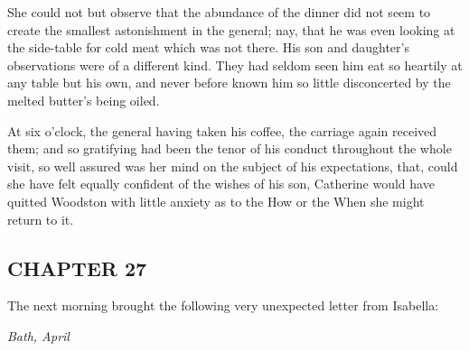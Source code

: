 She could not but observe that the abundance of the dinner did not seem to create the smallest astonishment in the general; nay, that he was even looking at the side-table for cold meat which was not there. His son and daughter's observations were of a different kind. They had seldom seen him eat so heartily at any table but his own, and never before known him so little disconcerted by the melted butter's being oiled.

At six o'clock, the general having taken his coffee, the carriage again received them; and so gratifying had been the tenor of his conduct throughout the whole visit, so well assured was her mind on the subject of his expectations, that, could she have felt equally confident of the wishes of his son, Catherine would have quitted Woodston with little anxiety as to the How or the When she might return to it.

\subsection[chapter-27]{\useURL[url29][][][]\from[url29]CHAPTER 27}

The next morning brought the following very unexpected letter from Isabella:

{\em Bath, April}

